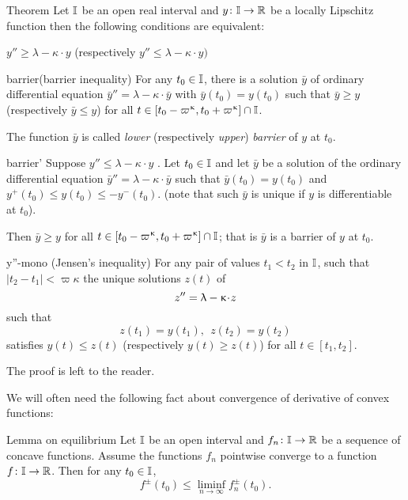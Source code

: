 \begin{thm}{Theorem}\label{y''=<1-ky}
Let $\mathbb{I}$ be an open real interval and $y\:\II\to\RR$ be a locally Lipschitz function
then the following conditions are equivalent:
\begin{subthm}{}$y''\ge \lambda-\kappa\cdot  y$ (respectively $y''\le \lambda-\kappa\cdot  y)$
\end{subthm}

\begin{subthm}{barrier}(barrier inequality) For any $t_0\in \II$, 
there is a solution $\bar y$ 
of ordinary differential equation $\bar y''=\lambda-\kappa\cdot  \bar y$ 
with $\bar y(t_0)= y(t_0)$ such that $\bar y\ge y$ (respectively $\bar y\le y$) for all $t\in [t_0-\varpi\kappa,t_0+\varpi\kappa]\cap \II$.

The function $\bar y$ is called \emph{lower} (respectively \emph{upper}) \emph{barrier} of $y$ at $t_0$.
\end{subthm}

\begin{subthm}{barrier'} 
Suppose $y''\le \lambda-\kappa\cdot  y$ . Let $t_0\in\II$ and let  $\bar y$ be a solution of  the
 ordinary differential equation $\bar y''=\lambda-\kappa\cdot  \bar y$ 
such that  $\bar y(t_0)= y(t_0)$ and $y^+(t_0)\le y(t_0)\le -y^-(t_0)$. (note that such $\bar{y}$ is unique if $y$ is differentiable at $t_0$). 

Then $\bar y\ge y$  for all $t\in [t_0-\varpi\kappa,t_0+\varpi\kappa]\cap \II$; that is $\bar{y}$ is a barrier of $y$ at $t_0$.
\end{subthm}

\begin{subthm}{y''-mono} (Jensen's inequality)
For any pair of values $t_1<t_2$ in $\mathbb{I}$, such that $|t_2-t_1|<\varpi\kappa$ the unique solutions $z(t)$ of \[z''\z=\lambda-\kappa\cdot  z\] such that
\[z(t_1)=y(t_1),\ \ z(t_2)=y(t_2)\] 
satisfies $y(t)\le z(t)$ (respectively $y(t)\ge z(t)$) for all $t\in[t_1,t_2]$.
\end{subthm}
\end{thm}

The proof is left to the reader.

We will often need the following fact about convergence of derivative of convex functions:

{\sloppy 

\begin{thm}{Lemma on equilibrium}\label{lem:der-conv-lim}
Let $\mathbb{I}$ be an open interval 
and $f_n\:\II\to\RR$ be a sequence of concave functions. 
Assume the functions $f_n$ pointwise converge to a function $f\:\II\to\RR$.
Then for any $t_0\in \II$,
\[f^\pm(t_0)\le \liminf_{n\to\infty}f^\pm_n(t_0).\]
\end{thm}

}

